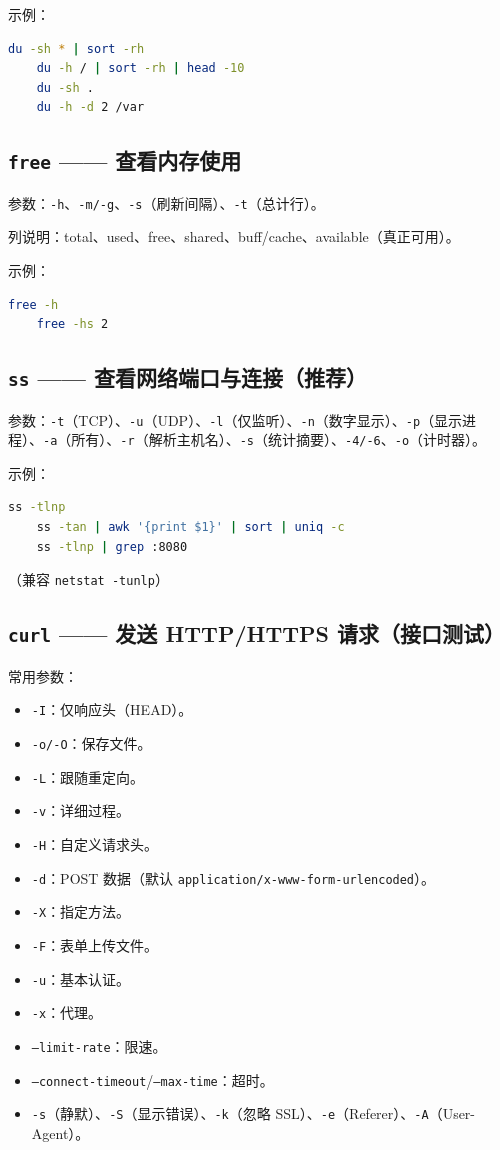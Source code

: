 示例：
\begin{lstlisting}[language=bash]
	du -sh * | sort -rh
	du -h / | sort -rh | head -10
	du -sh .
	du -h -d 2 /var
\end{lstlisting}

\subsection*{\texttt{free} —— 查看内存使用} 参数：\texttt{-h}、\texttt{-m/-g}、\texttt{-s}（刷新间隔）、\texttt{-t}（总计行）。

列说明：total、used、free、shared、buff/cache、available（真正可用）。

示例：
\begin{lstlisting}[language=bash]
	free -h
	free -hs 2
\end{lstlisting}

\subsection*{\texttt{ss} —— 查看网络端口与连接（推荐）} 参数：\texttt{-t}（TCP）、\texttt{-u}（UDP）、\texttt{-l}（仅监听）、\texttt{-n}（数字显示）、\texttt{-p}（显示进程）、\texttt{-a}（所有）、\texttt{-r}（解析主机名）、\texttt{-s}（统计摘要）、\texttt{-4/-6}、\texttt{-o}（计时器）。

示例：
\begin{lstlisting}[language=bash]
	ss -tlnp
	ss -tan | awk '{print $1}' | sort | uniq -c
	ss -tlnp | grep :8080
\end{lstlisting}

（兼容 \texttt{netstat -tunlp}）

\subsection*{\texttt{curl} —— 发送 HTTP/HTTPS 请求（接口测试）} 常用参数：
\begin{itemize}
\item \texttt{-I}：仅响应头（HEAD）。
\item \texttt{-o/-O}：保存文件。
\item \texttt{-L}：跟随重定向。
\item \texttt{-v}：详细过程。
\item \texttt{-H}：自定义请求头。
\item \texttt{-d}：POST 数据（默认 \texttt{application/x-www-form-urlencoded}）。
\item \texttt{-X}：指定方法。
\item \texttt{-F}：表单上传文件。
\item \texttt{-u}：基本认证。
\item \texttt{-x}：代理。
\item \texttt{--limit-rate}：限速。
\item \texttt{--connect-timeout}/\texttt{--max-time}：超时。
\item \texttt{-s}（静默）、\texttt{-S}（显示错误）、\texttt{-k}（忽略 SSL）、\texttt{-e}（Referer）、\texttt{-A}（User-Agent）。
\end{itemize}

